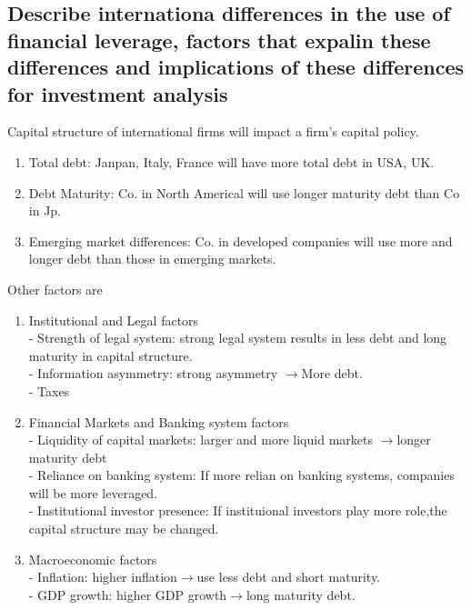 \documentclass{article}
\newcommand{\be}{\begin{enumerate}}
\newcommand{\ee}{\end{enumerate}}
\newcommand{\ra}{$\rightarrow$}
\begin{document}
\subsection{Describe internationa differences in the use of financial leverage, 
factors that expalin these differences and implications of these differences for investment analysis}
Capital structure of international firms will impact a firm's capital policy.
\be
    \item Total debt: Janpan, Italy, France will have more total debt in USA, UK.
    \item Debt Maturity: Co. in North Americal will use longer maturity debt than Co in Jp.
    \item Emerging market differences: Co. in developed companies will use more and longer debt
        than those in emerging markets.
\ee
Other factors are
\be
    \item Institutional and Legal factors
        \\- Strength of legal system: strong legal system results in less debt and long maturity
        in capital structure.
        \\- Information asymmetry: strong asymmetry \ra More debt. 
        \\- Taxes
    \item Financial Markets and Banking system factors
        \\- Liquidity of capital markets: larger and more liquid markets \ra longer maturity debt
        \\- Reliance on banking system: If more relian on banking systems, companies
        will be more leveraged.
        \\- Institutional investor presence: If instituional investors play more role,the
        capital structure may be changed.
    \item Macroeconomic factors
        \\- Inflation: higher inflation\ra use less debt and short maturity.
        \\- GDP growth: higher GDP growth\ra long maturity debt.
\ee
\end{document}
